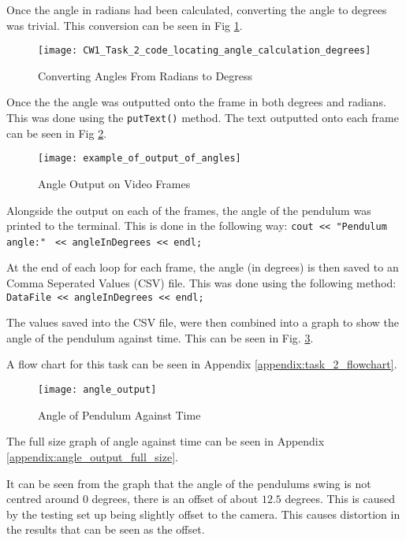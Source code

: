 \documentclass[conference]{IEEEtran}
\begin{document}
Once the angle in radians had been calculated, converting the angle to degrees was trivial. This conversion can be seen in Fig \ref{fig:CW1_Task_2_code_locating_angle_calculation_degrees}.

\begin{figure}
\centerline{\texttt{[image: CW1\_Task\_2\_code\_locating\_angle\_calculation\_degrees]}}
\caption{Converting Angles From Radians to Degress}
\label{fig:CW1_Task_2_code_locating_angle_calculation_degrees}
\end{figure}

Once the the angle was outputted onto the frame in both degrees and radians. This was done using the \verb|putText()| method. The text outputted onto each frame can be seen in Fig \ref{fig:example_of_output_of_angles}.

\begin{figure}
\centerline{\texttt{[image: example\_of\_output\_of\_angles]}}
\caption{Angle Output on Video Frames}
\label{fig:example_of_output_of_angles}
\end{figure}

Alongside the output on each of the frames, the angle of the pendulum was printed to the terminal. This is done in the following way: \verb|cout << "Pendulum angle:"|
\verb| << angleInDegrees << endl;|

At the end of each loop for each frame, the angle (in degrees) is then saved to an Comma Seperated Values (CSV) file. This was done using the following method: \verb|DataFile << angleInDegrees << endl;|

The values saved into the CSV file, were then combined into a graph to show the angle of the pendulum against time. This can be seen in Fig. \ref{fig:angle_output}.

A flow chart for this task can be seen in Appendix \ref{appendix:task_2_flowchart}.

\begin{figure}
\centerline{\texttt{[image: angle\_output]}}
\caption{Angle of Pendulum Against Time}
\label{fig:angle_output}
\end{figure}

The full size graph of angle against time can be seen in Appendix \ref{appendix:angle_output_full_size}.

It can be seen from the graph that the angle of the pendulums swing is not centred around $0$ degrees, there is an offset of about $12.5$ degrees. This is caused by the testing set up being slightly offset to the camera. This causes distortion in the results that can be seen as the offset. 
\end{document}
